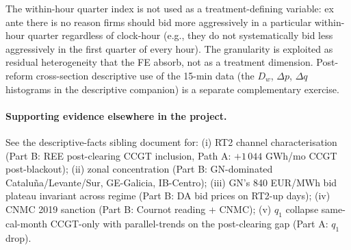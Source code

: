 \documentclass[11pt,a4paper]{article}
\newcommand{\code}[1]{\nolinkurl{#1}}
\begin{document}
The within-hour quarter index is not used as a treatment-defining variable: ex ante there is no reason firms should bid more aggressively in a particular within-hour quarter regardless of clock-hour (e.g., they do not systematically bid less aggressively in the first quarter of every hour). The granularity is exploited as residual heterogeneity that the FE absorb, not as a treatment dimension. Post-reform cross-section descriptive use of the 15-min data (the $D_w$, $\Delta p$, $\Delta q$ histograms in the descriptive companion) is a separate complementary exercise.

\paragraph{Supporting evidence elsewhere in the project.}
See the descriptive-facts sibling document for: (i) RT2 channel characterisation (Part B: REE post-clearing CCGT inclusion, Path A: $+1\,044$ GWh/mo CCGT post-blackout); (ii) zonal concentration (Part B: GN-dominated Cataluña/Levante/Sur, GE-Galicia, IB-Centro); (iii) GN's 840 EUR/MWh bid plateau invariant across regime (Part B: DA bid prices on RT2-up days); (iv) CNMC 2019 sanction (Part B: Cournot reading + CNMC); (v) $q_1$ collapse same-cal-month CCGT-only with parallel-trends on the post-clearing gap (Part A: $q_1$ drop).

\end{document}
